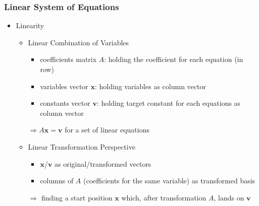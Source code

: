 \subsubsection{Linear System of Equations}
\begin{itemize}
\item Linearity
	\begin{itemize}
	\item Linear Combination of Variables
		\begin{itemize}
		\item coefficients matrix $A$: holding the coefficient for each equation (in row)
		\item variables vector $\mathbf x$: holding variables as column vector
		\item constants vector $\mathbf v$: holding target constant for each equations as column vector
		\end{itemize}
		$\Rightarrow A\mathbf x = \mathbf v$ for a set of linear equations
	\item Linear Transformation Perspective
		\begin{itemize}
		\item $\mathbf x$/$\mathbf v$ as original/transformed vectors
		\item columns of $A$ (coefficients for the same variable) as transformed basis
		\end{itemize}
		$\Rightarrow$ finding a start position $\mathbf x$ which, after transformation $A$, lands on $\mathbf v$		
	\end{itemize}


\end{itemize}
